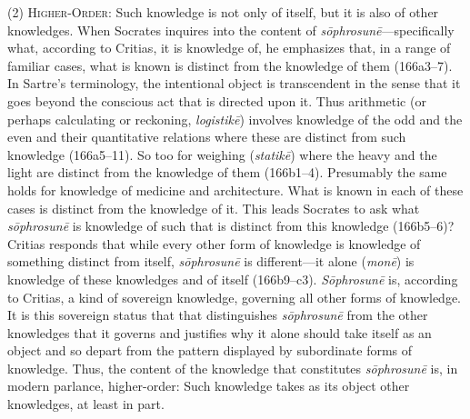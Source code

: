 (2) \textsc{Higher-Order}: Such knowledge is not only of itself, but it is also of other knowledges. When Socrates inquires into the content of \emph{sōphrosunē}—specifically what, according to Critias, it is knowledge of, he emphasizes that, in a range of familiar cases, what is known is distinct from the knowledge of them (166a3–7). In Sartre's terminology, the intentional object is transcendent in the sense that it goes beyond the conscious act that is directed upon it. Thus arithmetic (or perhaps calculating or reckoning, \emph{logistikē}) involves knowledge of the odd and the even and their quantitative relations where these are distinct from such knowledge (166a5–11). So too for weighing (\emph{statikē}) where the heavy and the light are distinct from the knowledge of them (166b1–4). Presumably the same holds for knowledge of medicine and architecture. What is known in each of these cases is distinct from the knowledge of it. This leads Socrates to ask what \emph{sōphrosunē} is knowledge of such that is distinct from this knowledge (166b5–6)? Critias responds that while every other form of knowledge is knowledge of something distinct from itself, \emph{sōphrosunē} is different—it alone (\emph{monē}) is knowledge of these knowledges and of itself (166b9–c3). \emph{Sōphrosunē} is, according to Critias, a kind of sovereign knowledge, governing all other forms of knowledge. It is this sovereign status that that distinguishes \emph{sōphrosunē} from the other knowledges that it governs and justifies why it alone should take itself as an object and so depart from the pattern displayed by subordinate forms of knowledge. Thus, the content of the knowledge that constitutes \emph{sōphrosunē} is, in modern parlance, higher-order: Such knowledge takes as its object other knowledges, at least in part.

